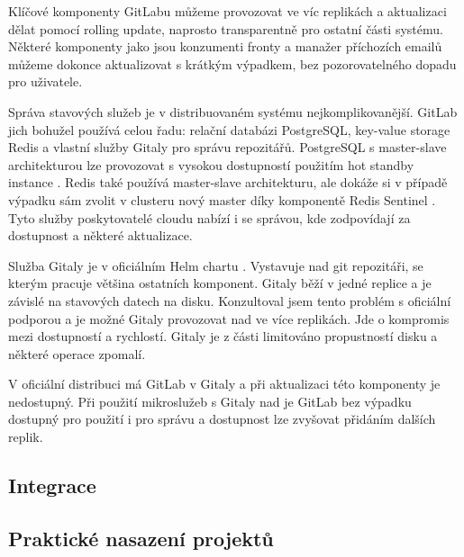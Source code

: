             Klíčové komponenty GitLabu můžeme provozovat ve víc replikách a aktualizaci dělat pomocí rolling update, naprosto transparentně pro ostatní části systému. Některé komponenty jako jsou konzumenti fronty a manažer příchozích emailů můžeme dokonce aktualizovat s krátkým výpadkem, bez pozorovatelného dopadu pro uživatele.

            Správa stavových služeb je v distribuovaném systému nejkomplikovanější. GitLab jich bohužel používá celou řadu: relační databázi PostgreSQL, key-value storage Redis a vlastní služby Gitaly pro správu repozitářů. PostgreSQL s master-slave architekturou lze provozovat s vysokou dostupností použitím hot standby instance \cite{kim-postgres}. Redis také používá master-slave architekturu, ale dokáže si v případě výpadku sám zvolit v clusteru nový master díky komponentě Redis Sentinel \cite{redis-ha}. Tyto služby poskytovatelé cloudu nabízí i se správou, kde zodpovídají za dostupnost a některé aktualizace.

            Služba Gitaly je v oficiálním Helm chartu . Vystavuje   nad git repozitáři, se kterým pracuje většina ostatních komponent. Gitaly běží v jedné replice a je závislé na stavových datech na disku. Konzultoval jsem tento problém s oficiální podporou a je možné Gitaly provozovat nad  ve více replikách. Jde o kompromis mezi dostupností a rychlostí. Gitaly je z části limitováno propustností disku a  některé operace zpomalí.

            V oficiální distribuci má GitLab  v Gitaly a při aktualizaci této komponenty je nedostupný. Při použití mikroslužeb s Gitaly nad  je GitLab bez výpadku dostupný pro použití i pro správu a dostupnost lze zvyšovat přidáním dalších replik.

    \subsection{Integrace}
        \blind[2]
        \blind[5]

    \subsection{Praktické nasazení projektů}
